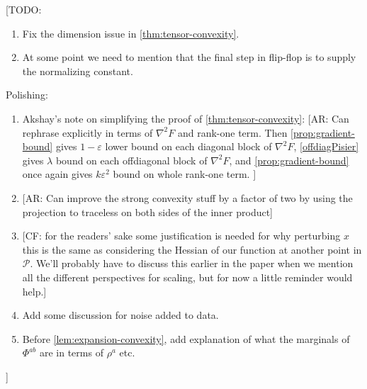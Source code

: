 \documentclass[aos]{imsart}
\theoremstyle{definition}
\numberwithin{equation}{section}
\newcommand{\eps}{\varepsilon}
\newcommand{\SPD}{\mathcal{P}}
\newcommand{\samp}{x}
\newcommand{\CF}[1]{{\color{purple}[CF: #1]}}
\newcommand{\AR}[1]{{\color{orange}[AR: #1]}}
\newcommand{\TODO}[1]{{\color{blue}[TODO: #1]}}
\begin{document}
\tableofcontents

\TODO{
\begin{enumerate}
\item Fix the dimension issue in \cref{thm:tensor-convexity}.
\item At some point we need to mention that the final step in flip-flop is to supply the normalizing constant.
\end{enumerate}
Polishing:
\begin{enumerate}
\item Akshay's note on simplifying the proof of \cref{thm:tensor-convexity}: \AR{Can rephrase explicitly in terms of $\nabla^{2} F$ and rank-one term. Then \cref{prop:gradient-bound} gives $1-\eps$ lower bound on each diagonal block of $\nabla^{2} F$, \cref{offdiagPisier} gives $\lambda$ bound on each offdiagonal block of $\nabla^{2} F$, and \cref{prop:gradient-bound} once again gives $k \eps^{2}$ bound on whole rank-one term.  }
\item \AR{Can improve the strong convexity stuff by a factor of two by using the projection to traceless on both sides of the inner product}
\item \CF{for the readers' sake some justification is needed for why perturbing $\samp$ this is the same as considering the Hessian of our function at another point in $\SPD$. We'll probably have to discuss this earlier in the paper when we mention all the different perspectives for scaling, but for now a little reminder would help.}
\item Add some discussion for noise added to data.
\item Before \cref{lem:expansion-convexity}, add explanation of what the marginals of $\Phi^{ab}$ are in terms of $\rho^{a}$ etc.
\end{enumerate}
}


\end{document}
